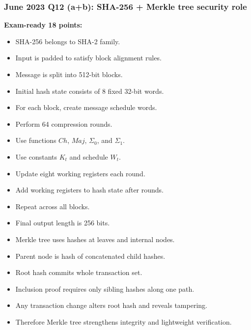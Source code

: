 \documentclass[12pt,a4paper]{article}
\begin{document}
\subsubsection*{June 2023 Q12 (a+b): SHA-256 + Merkle tree security role}
\textbf{Exam-ready 18 points:}
\begin{itemize}
\item SHA-256 belongs to SHA-2 family.
\item Input is padded to satisfy block alignment rules.
\item Message is split into 512-bit blocks.
\item Initial hash state consists of 8 fixed 32-bit words.
\item For each block, create message schedule words.
\item Perform 64 compression rounds.
\item Use functions \(Ch\), \(Maj\), \(\Sigma_0\), and \(\Sigma_1\).
\item Use constants \(K_t\) and schedule \(W_t\).
\item Update eight working registers each round.
\item Add working registers to hash state after rounds.
\item Repeat across all blocks.
\item Final output length is 256 bits.
\item Merkle tree uses hashes at leaves and internal nodes.
\item Parent node is hash of concatenated child hashes.
\item Root hash commits whole transaction set.
\item Inclusion proof requires only sibling hashes along one path.
\item Any transaction change alters root hash and reveals tampering.
\item Therefore Merkle tree strengthens integrity and lightweight verification.
\end{itemize}
\end{document}
